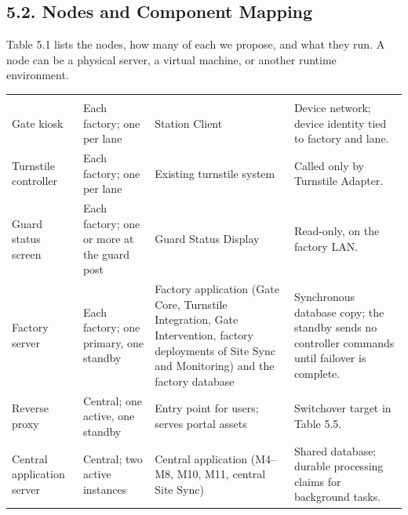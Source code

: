 \subsection*{5.2. Nodes and Component Mapping}

{}


Table 5.1 lists the nodes, how many of each we propose, and what they run. A node can be a physical server, a virtual machine, or another runtime environment.

\begin{longtable}{|>{\raggedright\arraybackslash}p{88pt}|>{\raggedright\arraybackslash}p{82pt}|>{\raggedright\arraybackslash}p{128pt}|>{\raggedright\arraybackslash}p{108pt}|}
\hline
\multicolumn{1}{|>{\columncolor{tableheader}\centering\arraybackslash}p{88pt}|}{\textbf{Node}} & \multicolumn{1}{>{\columncolor{tableheader}\centering\arraybackslash}p{82pt}|}{\textbf{Site and count}} & \multicolumn{1}{>{\columncolor{tableheader}\centering\arraybackslash}p{128pt}|}{\textbf{Runs or stores}} & \multicolumn{1}{>{\columncolor{tableheader}\centering\arraybackslash}p{108pt}|}{\textbf{Notes}} \\
\hline
\endhead
\multicolumn{4}{c}{\rule{0pt}{20pt}\normalsize\textbf{Table 5.1. Proposed Nodes}} \\
\endlastfoot
Gate kiosk & Each factory; one per lane & Station Client & Device network; device identity tied to factory and lane. \\
\hline
Turnstile controller & Each factory; one per lane & Existing turnstile system & Called only by Turnstile Adapter. \\
\hline
Guard status screen & Each factory; one or more at the guard post & Guard Status Display & Read-only, on the factory LAN. \\
\hline
Factory server & Each factory; one primary, one standby & Factory application (Gate Core, Turnstile Integration, Gate Intervention, factory deployments of Site Sync and Monitoring) and the factory database & Synchronous database copy; the standby sends no controller commands until failover is complete. \\
\hline
Reverse proxy & Central; one active, one standby & Entry point for users; serves portal assets & Switchover target in Table 5.5. \\
\hline
Central application server & Central; two active instances & Central application (M4--M8, M10, M11, central Site Sync) & Shared database; durable processing claims for background tasks. \\

\end{longtable}
